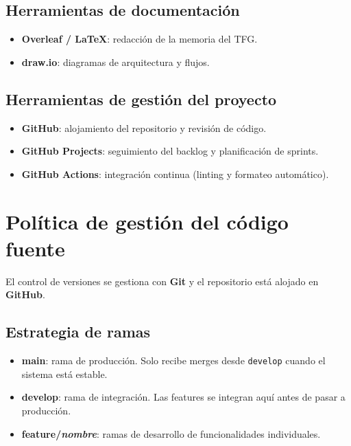 \subsection{Herramientas de documentación}

\begin{itemize}
    \item \textbf{Overleaf / LaTeX}: redacción de la memoria del TFG.
    \item \textbf{draw.io}: diagramas de arquitectura y flujos.
\end{itemize}

\subsection{Herramientas de gestión del proyecto}

\begin{itemize}
    \item \textbf{GitHub}: alojamiento del repositorio y revisión de código.
    \item \textbf{GitHub Projects}: seguimiento del backlog y planificación de sprints.
    \item \textbf{GitHub Actions}: integración continua (linting y formateo automático).
\end{itemize}

\section{Política de gestión del código fuente}

El control de versiones se gestiona con \textbf{Git} y el repositorio está alojado en \textbf{GitHub}.

\subsection{Estrategia de ramas}

\begin{itemize}
    \item \textbf{main}: rama de producción. Solo recibe merges desde \texttt{develop} cuando el sistema está estable.
    \item \textbf{develop}: rama de integración. Las features se integran aquí antes de pasar a producción.
    \item \textbf{feature/\textit{nombre}}: ramas de desarrollo de funcionalidades individuales.
\end{itemize}

